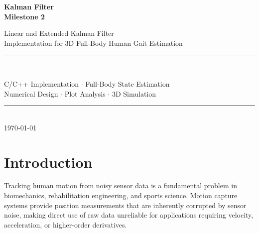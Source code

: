 \documentclass[12pt,a4paper]{article}
\begin{document}
\begin{titlepage}
    \centering
    \vspace*{2cm}
    {\Huge\bfseries\color{accentblue} Kalman Filter\\[0.4em]
    \large Milestone 2\par}
    \vspace{1.5cm}
    {\Large Linear and Extended Kalman Filter\\
    Implementation for 3D Full-Body Human Gait Estimation\par}
    \vspace{2cm}
    \rule{0.6\textwidth}{0.4pt}\\[0.5cm]
    {\large C/C++ Implementation $\cdot$ Full-Body State Estimation\\
    Numerical Design $\cdot$ Plot Analysis $\cdot$ 3D Simulation\par}
    \vspace{1.5cm}
    \rule{0.6\textwidth}{0.4pt}\\[0.5cm]
    {\large\today}
    \vfill
    \begin{abstract}
    \noindent
    This report presents the full implementation of a Linear Kalman Filter (LKF) and
    Extended Kalman Filter (EKF) for estimating the 3D kinematic state of a 23-joint
    human body during walking. Each joint is modelled with a 12-dimensional constant-jerk
    state vector, yielding a 276-dimensional full-body state. Both filters are implemented
    in C/C++ with careful attention to numerical stability, computational efficiency, and
    memory management. The LKF uses a linear Cartesian measurement model while the EKF
    employs a nonlinear spherical coordinate model requiring a manually implemented
    arctan2 approximation. Filtered outputs are analysed through time-series plots, RMSE
    comparisons, and 3D full-body walking animations.
    \end{abstract}
\end{titlepage}

\tableofcontents
\newpage

\section{Introduction}

Tracking human motion from noisy sensor data is a fundamental problem in biomechanics,
rehabilitation engineering, and sports science. Motion capture systems provide position
measurements that are inherently corrupted by sensor noise, making direct use of raw data
unreliable for applications requiring velocity, acceleration, or higher-order derivatives.
\end{document}
